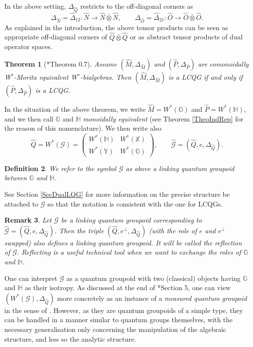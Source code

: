 \documentclass[reqno]{amsart}
\numberwithin{equation}{section}
\newtheorem{Theorem}{Theorem}[section]
\newtheorem{Def}[Theorem]{Definition}
\newtheorem{Rem}[Theorem]{Remark}
\newcommand{\G}{\mathbb{G}}
\newcommand{\Hh}{\mathbb{H}}
\newcommand{\X}{\mathbb{X}}
\newcommand{\Y}{\mathbb{Y}}
\newcommand{\msG}{\mathscr{G}}
\begin{document}
In the above setting, $\Delta_{\hat{Q}}$ restricts to the off-diagonal corners as  
\[
\Delta_{\hat{N}} = \hat{\Delta}_{12}\colon\hat{N}\rightarrow  \hat{N}\bar{\otimes}\hat{N},\qquad \Delta_{\hat{O}} = \hat{\Delta}_{21}\colon \hat{O}\rightarrow \hat{O}\bar{\otimes}\hat{O}.
\] 
As explained in the introduction, the above tensor products can be seen as appropriate off-diagonal corners of $\hat{Q}\bar{\otimes}\hat{Q}$ or as abstract tensor products of dual operator spaces.

\begin{Theorem}[{\cite{DC11a}*{Theorem 0.7}}]
Assume $(\hat{M},\Delta_{\hat{M}})$ and $(\hat{P},\Delta_{\hat{P}})$ are comonoidally W$^*$-Morita equivalent W$^*$-bialgebras.  Then $(\hat{M},\Delta_{\hat{M}})$ is a LCQG if and only if $(\hat{P},\Delta_{\hat{P}})$ is a LCQG.  
\end{Theorem} 

In the situation of the above theorem, we write $\hat{M} = W^*(\G)$ and $\hat{P} = W^*(\Hh)$, and we then call $\G$ and $\Hh$ \emph{monoidally equivalent} (see Theorem \ref{TheoIndRep} for the reason of this nomenclature). We then write  also
\[
\hat{Q} = W^*(\msG) =  \begin{pmatrix} W^*(\Hh) & W^*(\X) \\ W^*(\Y) & W^*(\G)\end{pmatrix},\qquad \hat{\msG} = (\hat{Q},e,\Delta_{\hat{Q}}). 
\]


\begin{Def}\label{DefLinkingQuantumGroupoid}
We refer to the symbol $\msG$ as above a \emph{linking quantum groupoid} between $\G$ and $\Hh$. 
\end{Def}


See Section \ref{SecDualLQG} for more information on the precise structure be attached to $\msG$ so that the notation is consistent with the one for LCQGs.

\begin{Rem}\label{rem1}
Let $\msG$ be a linking quantum groupoid corresponding to $\hat{\msG}=(\hat{Q},e,\Delta_{\hat{Q}})$. Then the triple $(\hat{Q},e^{\perp},\Delta_{\hat{Q}})$ (with the role of $e$ and $e^{\perp}$ swapped) also defines a linking quantum groupoid. It will be called the \emph{reflection} of $\msG$. Reflecting is a useful technical tool when we want to exchange the roles of $\G$ and $\Hh$.
\end{Rem}

One can interpret $\msG$ as a quantum groupoid with two (classical) objects having $\G$ and $\Hh$ as their isotropy. As discussed at the end of \cite{DC11a}*{Section 5}, one can view $(W^*(\msG),\Delta_{\hat{Q}})$ more concretely as an instance of a \emph{measured quantum groupoid} in the sense of \cite{Les07}. However, as they are quantum groupoids of a simple type, they can be handled in a manner similar to quantum groups themselves, with the necessary generalisation only concerning the manipulation of the algebraic structure, and less so the analytic structure.  
\end{document}
